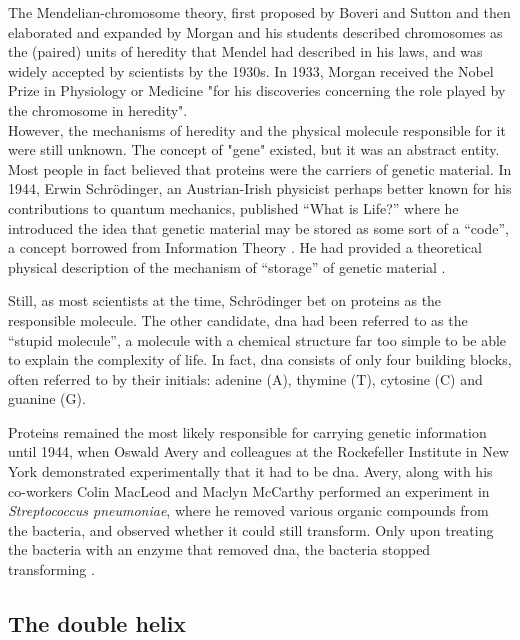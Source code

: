 \vspace{3mm}

The Mendelian-chromosome theory, first proposed by Boveri and Sutton \cite{sutton1903chromosomes} and then elaborated and expanded by Morgan and his students \cite{morgan1915mechanism} described chromosomes as the (paired) units of heredity that Mendel had described in his laws, and was widely accepted by scientists by the 1930s. 
In 1933, Morgan received the Nobel Prize in Physiology or Medicine "for his discoveries concerning the role played by the chromosome in heredity".\\

However, the mechanisms of heredity and the physical molecule responsible for it were still unknown. 
The concept of "gene" existed, but it was an abstract entity. 
Most people in fact believed that proteins were the carriers of genetic material. 
In 1944, Erwin  Schrödinger, an Austrian-Irish physicist perhaps better known for his contributions to quantum mechanics, published “What is Life?” where he introduced the idea that genetic material may be stored as some sort of a “code”, a concept borrowed from Information Theory \cite{schrodinger1944what}. 
He had provided a theoretical physical description of the mechanism of “storage” of genetic material \cite{mukherjee2016gene}.

Still, as most scientists at the time, Schrödinger bet on proteins as the responsible molecule. 
The other candidate, \gls{dna} had been referred to as the “stupid molecule”, a molecule with a chemical structure far too simple to be able to explain the complexity of life. 
In fact, \gls{dna} consists of only four building blocks, often referred to by their initials: adenine (A), thymine (T), cytosine (C) and guanine (G).

Proteins remained the most likely responsible for carrying genetic information until 1944, when Oswald Avery and colleagues at the Rockefeller Institute in New York demonstrated experimentally that it had to be \gls{dna}. 
Avery, along with his co-workers Colin MacLeod and Maclyn McCarthy performed an experiment in \textit{Streptococcus pneumoniae}, where he removed various organic compounds from the bacteria, and observed whether it could still transform. 
Only upon treating the bacteria with an enzyme that removed \gls{dna}, the bacteria stopped transforming \cite{avery1944studies}.


\subsection{The double helix} %

